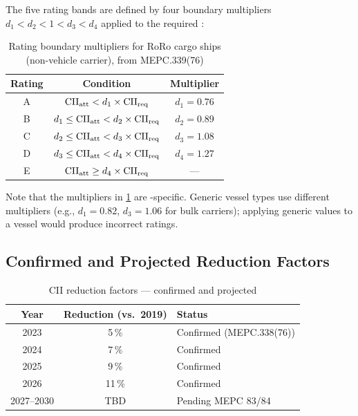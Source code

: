 The five rating bands are defined by four boundary multipliers
$d_1 < d_2 < 1 < d_3 < d_4$ applied to the required \CII{}:

\begin{table}[h]
\centering
\caption{Rating boundary multipliers for RoRo cargo ships (non-vehicle
         carrier), from MEPC.339(76)}
\label{tab:rating_boundaries}
\begin{tabular}{ccc}
  \toprule
  Rating & Condition & Multiplier \\
  \midrule
  A & $\mathrm{CII}_{\mathrm{att}} < d_1 \times \mathrm{CII}_{\mathrm{req}}$ & $d_1 = 0.76$ \\
  B & $d_1 \leq \mathrm{CII}_{\mathrm{att}} < d_2 \times \mathrm{CII}_{\mathrm{req}}$ & $d_2 = 0.89$ \\
  C & $d_2 \leq \mathrm{CII}_{\mathrm{att}} < d_3 \times \mathrm{CII}_{\mathrm{req}}$ & $d_3 = 1.08$ \\
  D & $d_3 \leq \mathrm{CII}_{\mathrm{att}} < d_4 \times \mathrm{CII}_{\mathrm{req}}$ & $d_4 = 1.27$ \\
  E & $\mathrm{CII}_{\mathrm{att}} \geq d_4 \times \mathrm{CII}_{\mathrm{req}}$ & --- \\
  \bottomrule
\end{tabular}
\end{table}

Note that the multipliers in \cref{tab:rating_boundaries} are
\RoRo{}-specific.  Generic vessel types use different multipliers
(e.g., $d_1 = 0.82$, $d_3 = 1.06$ for bulk carriers); applying generic
values to a \RoRo{} vessel would produce incorrect ratings.

\subsection{Confirmed and Projected Reduction Factors}
\label{app:cii:reduction}

\begin{table}[h]
\centering
\caption{CII reduction factors --- confirmed and projected}
\label{tab:reduction_factors}
\begin{tabular}{ccl}
  \toprule
  Year & Reduction (vs.\ 2019) & Status \\
  \midrule
  2023 & 5\,\%  & Confirmed (MEPC.338(76)) \\
  2024 & 7\,\%  & Confirmed \\
  2025 & 9\,\%  & Confirmed \\
  2026 & 11\,\% & Confirmed \\
  2027--2030 & TBD & Pending MEPC 83/84 \\
  \bottomrule
\end{tabular}
\end{table}

